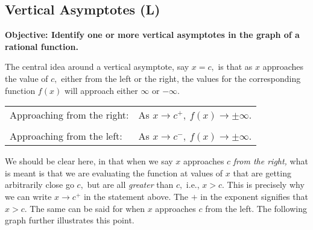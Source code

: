 \documentclass[12pt]{book}
\theoremstyle{definition}
\begin{document}
\subsection{Vertical Asymptotes (L)}
{\bf Objective: Identify one or more vertical asymptotes in the graph of a rational function.}\par
The central idea around a vertical asymptote, say $x=c,$ is that as $x$ approaches the value of $c,$ either from the left or the right, the values for the corresponding function $f(x)$ will approach either $\infty$ or $-\infty$.
\begin{center}
\begin{tabular}{ll}
Approaching from the right: & As $x\rightarrow c^+, \ f(x)\rightarrow\pm\infty.$\\
&\\
Approaching from the left: & As $x\rightarrow c^-, \ f(x)\rightarrow\pm\infty.$
\end{tabular}
\end{center}
We should be clear here, in that when we say $x$ approaches $c$ {\it from the right,} what is meant is that we are evaluating the function at values of $x$ that are getting arbitrarily close go $c,$ but are all {\it greater} than $c,$ i.e., $x>c$.  This is precisely why we can write $x\rightarrow c^+$ in the statement above.  The $+$ in the exponent signifies that $x>c.$ The same can be said for when $x$ approaches $c$ from the left.  The following graph further illustrates this point.
\begin{center}
\end{center}
\end{document}
